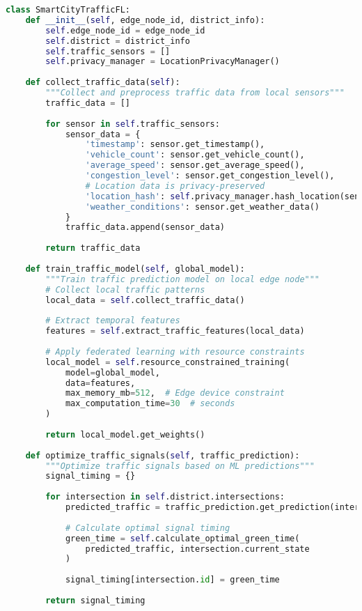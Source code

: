 \begin{lstlisting}[language=python, caption=Smart City Traffic FL Implementation]
class SmartCityTrafficFL:
    def __init__(self, edge_node_id, district_info):
        self.edge_node_id = edge_node_id
        self.district = district_info
        self.traffic_sensors = []
        self.privacy_manager = LocationPrivacyManager()
        
    def collect_traffic_data(self):
        """Collect and preprocess traffic data from local sensors"""
        traffic_data = []
        
        for sensor in self.traffic_sensors:
            sensor_data = {
                'timestamp': sensor.get_timestamp(),
                'vehicle_count': sensor.get_vehicle_count(),
                'average_speed': sensor.get_average_speed(),
                'congestion_level': sensor.get_congestion_level(),
                # Location data is privacy-preserved
                'location_hash': self.privacy_manager.hash_location(sensor.location),
                'weather_conditions': sensor.get_weather_data()
            }
            traffic_data.append(sensor_data)
            
        return traffic_data
        
    def train_traffic_model(self, global_model):
        """Train traffic prediction model on local edge node"""
        # Collect local traffic patterns
        local_data = self.collect_traffic_data()
        
        # Extract temporal features
        features = self.extract_traffic_features(local_data)
        
        # Apply federated learning with resource constraints
        local_model = self.resource_constrained_training(
            model=global_model,
            data=features,
            max_memory_mb=512,  # Edge device constraint
            max_computation_time=30  # seconds
        )
        
        return local_model.get_weights()
        
    def optimize_traffic_signals(self, traffic_prediction):
        """Optimize traffic signals based on ML predictions"""
        signal_timing = {}
        
        for intersection in self.district.intersections:
            predicted_traffic = traffic_prediction.get_prediction(intersection.id)
            
            # Calculate optimal signal timing
            green_time = self.calculate_optimal_green_time(
                predicted_traffic, intersection.current_state
            )
            
            signal_timing[intersection.id] = green_time
            
        return signal_timing
\end{lstlisting}

